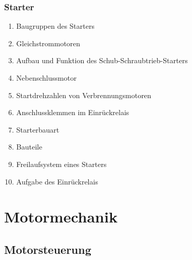 \subsubsection{Starter}\label{starter}

\begin{enumerate}
\item
  Baugruppen des Starters\\
\item
  Gleichstrommotoren\\
\item
  Aufbau und Funktion des Schub-Schraubtrieb-Starters\\
\item
  Nebenschlussmotor\\
\item
  Startdrehzahlen von Verbrennungsmotoren\\
\item
  Anschlussklemmen im Einrückrelais\\
\item
  Starterbauart\\
\item
  Bauteile\\
\item
  Freilaufsystem eines Starters\\
\item
  Aufgabe des Einrückrelais
\end{enumerate}

\section{Motormechanik}\label{motormechanik-1}

\subsection{Motorsteuerung}\label{motorsteuerung-1}

